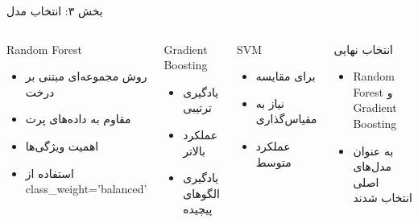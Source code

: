 \documentclass[aspectratio=169]{beamer}
\begin{document}
\begin{frame}{بخش ۳: انتخاب مدل}
\begin{columns}
\begin{block}{Random Forest}
\begin{itemize}
\item روش مجموعه‌ای مبتنی بر درخت
\item مقاوم به داده‌های پرت
\item اهمیت ویژگی‌ها
\item استفاده از class\_weight='balanced'
\end{itemize}
\end{block}

\begin{block}{Gradient Boosting}
\begin{itemize}
\item یادگیری ترتیبی
\item عملکرد بالاتر
\item یادگیری الگوهای پیچیده
\end{itemize}
\end{block}

\begin{block}{SVM}
\begin{itemize}
\item برای مقایسه
\item نیاز به مقیاس‌گذاری
\item عملکرد متوسط
\end{itemize}
\end{block}

\begin{block}{انتخاب نهایی}
\begin{itemize}
\item Random Forest و Gradient Boosting
\item به عنوان مدل‌های اصلی انتخاب شدند
\end{itemize}
\end{block}
\end{columns}
\end{frame}
\end{document}
